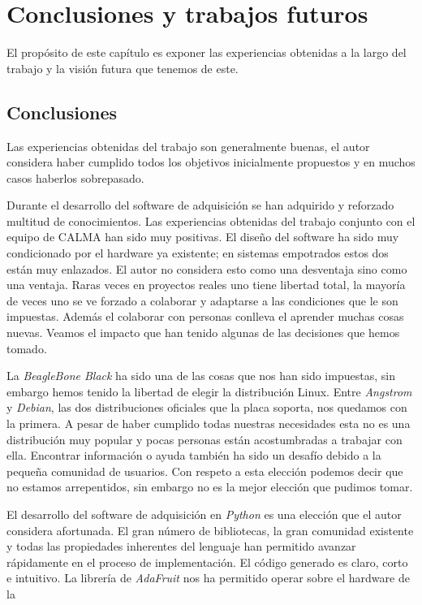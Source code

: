 \chapter{Conclusiones y trabajos futuros}
\label{cap_conclusiones}
El propósito de este capítulo es exponer las experiencias obtenidas a la largo del trabajo y la visión futura que tenemos de este.

\section{Conclusiones}
	Las experiencias obtenidas del trabajo son generalmente buenas, el autor considera haber cumplido todos los objetivos inicialmente propuestos
	y en muchos casos haberlos sobrepasado. 
	\par
	Durante el desarrollo del software de adquisición se han adquirido y reforzado multitud de conocimientos. Las experiencias obtenidas del
	trabajo conjunto con el equipo de CALMA han sido muy positivas. El diseño del software ha sido muy condicionado por el hardware ya existente;
	en sistemas empotrados estos dos están muy enlazados. El autor no considera esto como una desventaja sino como una ventaja. Raras veces en
	proyectos reales uno tiene libertad total, la mayoría de veces uno se ve forzado  a colaborar y adaptarse a las condiciones que le son
	impuestas. Además el colaborar con personas conlleva el aprender muchas cosas nuevas. Veamos el impacto que han tenido algunas de las
	decisiones que hemos tomado.
	\par
	La \emph{BeagleBone Black} ha sido una de las cosas que nos han sido impuestas, sin embargo hemos tenido la libertad de elegir la distribución Linux.
	Entre \emph{Angstrom} y \emph{Debian}, las dos distribuciones oficiales que la placa soporta, nos quedamos con la primera. A pesar de haber cumplido todas
	nuestras necesidades esta no es una distribución muy popular y pocas personas están acostumbradas a trabajar con ella. Encontrar información o
	ayuda también ha sido un desafío debido a la pequeña comunidad de usuarios. Con respeto a esta elección podemos decir que no estamos
	arrepentidos, sin embargo no es la mejor elección que pudimos tomar. 
	\par
	El desarrollo del software de adquisición en \emph{Python} es una elección que el autor considera afortunada. El gran número de bibliotecas, la gran
	comunidad existente y todas las propiedades inherentes del lenguaje han permitido avanzar rápidamente en el proceso de implementación. El
	código generado es claro, corto e intuitivo. La librería de \emph{AdaFruit}\cite{AdaFruitGit} nos ha permitido operar sobre el hardware de la
